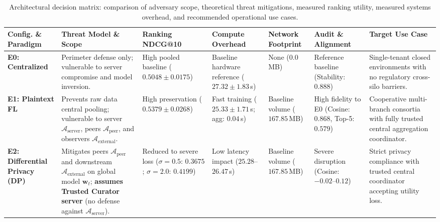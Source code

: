 \begin{landscape}
\begin{table}[H]
\centering
\scriptsize
\setlength{\tabcolsep}{4.0pt}
\renewcommand{\arraystretch}{1.30}
\caption{Architectural decision matrix: comparison of adversary scope, theoretical threat mitigations, measured ranking utility, measured systems overhead, and recommended operational use cases.}
\label{tab:practitioner_guide}
\begin{tabularx}{\linewidth}{>{\raggedright\arraybackslash}p{2.6cm}>{\raggedright\arraybackslash}p{4.6cm}>{\raggedright\arraybackslash}p{2.5cm}>{\raggedright\arraybackslash}p{2.6cm}>{\raggedright\arraybackslash}p{2.5cm}>{\raggedright\arraybackslash}p{3.8cm}>{\raggedright\arraybackslash}X}
\toprule
\textbf{Config. \& Paradigm} & \textbf{Threat Model \& Scope} & \textbf{Ranking NDCG@10} & \textbf{Compute Overhead} & \textbf{Network Footprint} & \textbf{Audit \& Alignment} & \textbf{Target Use Case} \\
\midrule
\textbf{E0: Centralized} & Perimeter defense only; vulnerable to server compromise and model inversion. & High pooled baseline ($0.5048 \pm 0.0175$) & Baseline hardware reference ($27.32 \pm 1.83$\,s) & None ($0.0$\,MB) & Reference baseline (Stability: $0.888$) & Single-tenant closed environments with no regulatory cross-silo barriers. \\
\midrule
\textbf{E1: Plaintext FL} & Prevents raw data central pooling; vulnerable to server $\mathcal{A}_{\text{server}}$, peers $\mathcal{A}_{\text{peer}}$, and observers $\mathcal{A}_{\text{external}}$. & High preservation ($0.5379 \pm 0.0268$) & Fast training ($25.33 \pm 1.71$\,s; agg: $0.04$\,s) & Baseline volume ($167.85$\,MB) & High fidelity to E0 (Cosine: $0.868$, Top-5: $0.579$) & Cooperative multi-branch consortia with fully trusted central aggregation coordinator. \\
\midrule
\textbf{E2: Differential Privacy (DP)} & Mitigates peers $\mathcal{A}_{\text{peer}}$ and downstream $\mathcal{A}_{\text{external}}$ on global model $\mathbf{w}_t$; \textbf{assumes Trusted Curator server} (no defense against $\mathcal{A}_{\text{server}}$). & Reduced to severe loss ($\sigma=0.5$: $0.3675$; $\sigma=2.0$: $0.4199$) & Low latency impact ($25.28$--$26.47$\,s) & Baseline volume ($167.85$\,MB) & Severe disruption (Cosine: $-0.02\text{--}0.12$) & Strict privacy compliance with trusted central coordinator accepting utility loss. \\

\end{tabularx}
\end{table}
\end{landscape}
